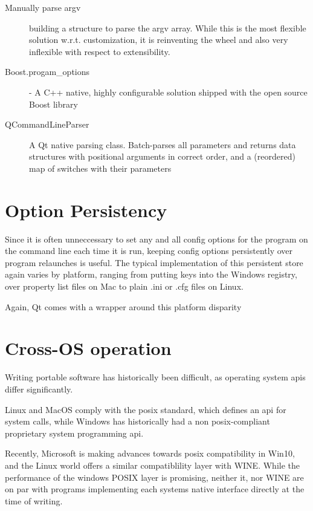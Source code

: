 \begin{description}
\item [Manually parse argv] building a structure to parse the argv array. While this is the most flexible solution w.r.t. customization, it is reinventing the wheel and also very inflexible with respect to extensibility.
\item [Boost.progam\_options] - A C++ native, highly configurable solution shipped with the open source Boost library
\item [QCommandLineParser] A Qt native parsing class. Batch-parses all parameters and returns data structures with positional arguments in correct order, and a (reordered) map of switches with their parameters
	
\end{description}



\section{Option Persistency}
Since it is often unneccessary to set any and all config options for the program on the command line each time it is run, keeping config options persistently over program relaunches is useful. The typical implementation of this persistent store again varies by platform, ranging from putting keys into the Windows registry, over property list files on Mac to plain .ini or .cfg files on Linux.

Again, Qt comes with a wrapper around this platform disparity



\section{Cross-OS operation}

Writing portable software has historically been difficult, as operating system \gls{api}s differ significantly. 

Linux and MacOS comply with the \gls{posix} standard, which defines an \gls{api} for system calls, while Windows has historically had a non \gls{posix}-compliant proprietary system programming \gls{api}.

Recently, Microsoft is making advances towards \gls{posix} compatibility in Win10, and the Linux world offers a similar compatiblility layer with WINE. While the performance of the windows POSIX layer is promising, neither it, nor WINE are on par with programs implementing each systems native interface directly at the time of writing.

